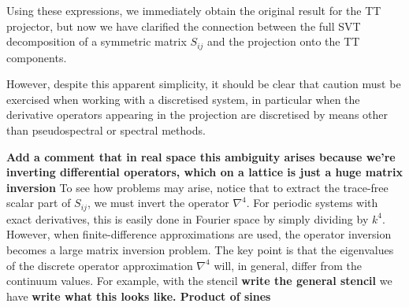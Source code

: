 \documentclass{revtex4}
\begin{document}
Using these expressions, we immediately obtain the original result for the TT projector,
but now we have clarified the connection between the full SVT decomposition of a symmetric matrix $S_{ij}$ and the projection onto the TT components.

However, despite this apparent simplicity, it should be clear that caution must be exercised when working with a discretised system, in particular when the derivative operators appearing in the projection are discretised by means other than pseudospectral or spectral methods.

{\bf Add a comment that in real space this ambiguity arises because we're inverting differential operators, which on a lattice is just a huge matrix inversion}
To see how problems may arise, notice that to extract the trace-free scalar part of $S_{ij}$, we must invert the operator $\nabla^4$.
For periodic systems with exact derivatives, this is easily done in Fourier space by simply dividing by $k^4$.
However, when finite-difference approximations are used, the operator inversion becomes a large matrix inversion problem.
The key point is that the eigenvalues of the discrete operator approximation $\nabla^4$ will, in general, differ from the continuum values.
For example, with the stencil
{\bf write the general stencil}
we have
{\bf write what this looks like.  Product of sines}
\end{document}
